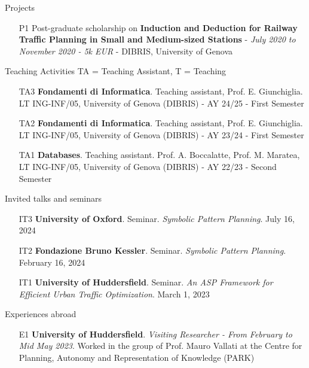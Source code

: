 \documentclass{resume} %
\begin{document}
\begin{rSection}{Projects}

\begin{enumerate}[leftmargin=5mm]
\item[P1] Post-graduate scholarship on \textbf{Induction and Deduction for Railway Traffic Planning in Small and Medium-sized Stations} - \textit{July 2020 to November 2020 - 5k EUR} - DIBRIS, University of Genova
\end{enumerate}
\end{rSection}

\begin{rSection}{Teaching Activities {\tiny TA = Teaching Assistant, T = Teaching}}
\begin{enumerate}[leftmargin=5mm]
\item[TA3] \textbf{Fondamenti di Informatica}. Teaching assistant, Prof. E. Giunchiglia. LT ING-INF/05, University of Genova (DIBRIS) - AY 24/25 - First Semester
\item[TA2] \textbf{Fondamenti di Informatica}. Teaching assistant, Prof. E. Giunchiglia. LT ING-INF/05, University of Genova (DIBRIS) - AY 23/24 - First Semester
\item[TA1] \textbf{Databases}. Teaching assistant. Prof. A. Boccalatte, Prof. M. Maratea, LT ING-INF/05, University of Genova (DIBRIS) - AY 22/23 - Second Semester
\end{enumerate}
\end{rSection}

\begin{rSection}{Invited talks and seminars}
\begin{enumerate}[leftmargin=5mm]
	\item[IT3] \textbf{University of Oxford}. Seminar. \textit{Symbolic Pattern Planning}. July 16, 2024
	\item[IT2] \textbf{Fondazione Bruno Kessler}. Seminar. \textit{Symbolic Pattern Planning}. February 16, 2024
	\item[IT1] \textbf{University of Huddersfield}. Seminar. \textit{An ASP Framework for Efficient Urban Traffic Optimization}. March 1, 2023
\end{enumerate}


\end{rSection}

\begin{rSection}{Experiences abroad}
\begin{enumerate}[leftmargin=5mm]
\item[E1] \textbf{University of Huddersfield}. \textit{Visiting Researcher - From February to Mid May 2023}. Worked in the group of Prof. Mauro Vallati at the Centre for Planning, Autonomy and Representation of Knowledge (PARK)  
\end{enumerate}
\end{rSection}
\end{document}
